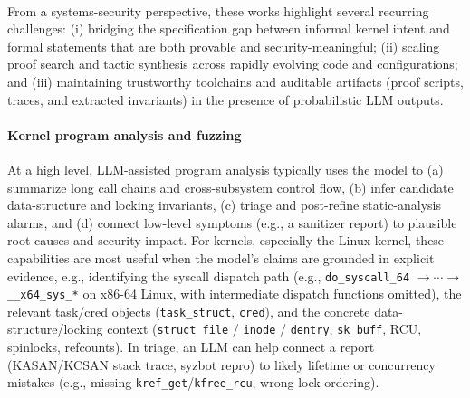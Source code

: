~
~

\begin{tcolorbox}[colback=gray!8, colframe=gray!55, boxrule=0.4pt, left=1mm, right=1mm, top=0.8mm, bottom=0.8mm, title=Key findings] From a systems-security perspective, these works highlight several recurring challenges: (i) bridging the specification gap between informal kernel intent and formal statements that are both provable and security-meaningful; (ii) scaling proof search and tactic synthesis across rapidly evolving code and configurations; and (iii) maintaining trustworthy toolchains and auditable artifacts (proof scripts, traces, and extracted invariants) in the presence of probabilistic LLM outputs. \end{tcolorbox}

\paragraph{Kernel program analysis and fuzzing} 


At a high level, LLM-assisted program analysis typically uses the model to (a) summarize long call chains and cross-subsystem control flow, (b) infer candidate data-structure and locking invariants, (c) triage and post-refine static-analysis alarms, and (d) connect low-level symptoms (e.g., a sanitizer report) to plausible root causes and security impact. 
For kernels, especially the Linux kernel, these capabilities are most useful when the model’s claims are grounded in explicit evidence, e.g., identifying the syscall dispatch path
(e.g., \texttt{do\_syscall\_64} $\rightarrow \cdots \rightarrow$\texttt{\_\_x64\_sys\_*} on x86-64 Linux, with intermediate dispatch functions omitted), 
the relevant task/cred objects (\texttt{task\_struct}, \texttt{cred}), and the concrete data-structure/locking context (\texttt{struct file} / \texttt{inode} / \texttt{dentry}, \texttt{sk\_buff}, RCU, spinlocks, refcounts). 
In triage, an LLM can help connect a report (KASAN/KCSAN stack trace, syzbot repro) to likely lifetime or concurrency mistakes (e.g., missing \texttt{kref\_get}/\texttt{kfree\_rcu}, wrong lock ordering). %

